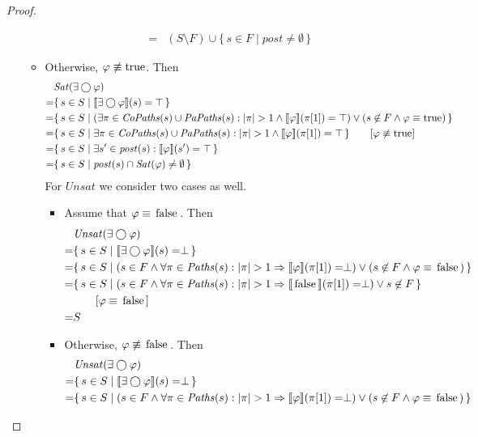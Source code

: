\documentclass[12pt]{article}
\newcommand{\nxt}{\bigcirc}
\newcommand{\TRUE}{\mbox{\lstinline{true}}}
\newcommand{\FALSE}{\mbox{\lstinline{false}}}
\theoremstyle{definition}
\newcommand{\comment}[1]{\hspace{2em}[\mbox{#1}]}
\newcommand{\satisfaction}[1]{\llbracket #1 \rrbracket}
\newenvironment{franck}{\color{red}}{\color{black}}
\begin{document}
\begin{proof}
\begin{itemize}
\begin{franck}
\begin{itemize}
\begin{align*}
= & (S \setminus F) \cup \{\, s \in F \mid \mathit{post} \not= \emptyset \,\}
\end{align*}
\item
Otherwise, $\varphi \not\equiv \TRUE$.  Then
\begin{align*}
& \mathit{Sat}(\exists \nxt \varphi)\\
= & \{\, s \in S \mid \satisfaction{\exists \nxt \varphi}(s) = \top \,\}\\
= & \{\, s \in S \mid (\exists \pi \in \mathit{CoPaths}(s) \cup \mathit{PaPaths}(s) : |\pi| > 1 \wedge \satisfaction{\varphi}(\pi[1]) = \top) \vee (s \not\in F \wedge \varphi \equiv \TRUE) \,\}\\
= & \{\, s \in S \mid \exists \pi \in \mathit{CoPaths}(s) \cup \mathit{PaPaths}(s) : |\pi| > 1 \wedge \satisfaction{\varphi}(\pi[1]) = \top \,\}
\comment{$\varphi \not\equiv \TRUE$}\\
= & \{\, s \in S \mid \exists s' \in \mathit{post}(s) :  \satisfaction{\varphi}(s') = \top \,\}\\
= & \{\, s \in S \mid \mathit{post}(s) \cap \mathit{Sat}(\varphi) \not= \emptyset \,\}
\end{align*}
For $\mathit{Unsat}$ we consider two cases as well.
\begin{itemize}
\item 
Assume that $\varphi \equiv \FALSE$.  Then
\begin{align*}
& \mathit{Unsat}(\exists \nxt \varphi)\\
= & \{\, s \in S \mid \satisfaction{\exists \nxt \varphi}(s) = \perp \,\}\\
= & \{\, s \in S \mid (s \in F \wedge \forall \pi \in \mathit{Paths}(s) : |\pi| > 1 \Rightarrow \satisfaction{\varphi}(\pi[1]) = \perp) \vee (s \not\in F \wedge \varphi \equiv \FALSE) \,\}\\
= & \{\, s \in S \mid (s \in F \wedge \forall \pi \in \mathit{Paths}(s) : |\pi| > 1 \Rightarrow \satisfaction{\FALSE}(\pi[1]) = \perp) \vee s \not\in F \,\}\\
& \comment{$\varphi \equiv \FALSE$}\\
= & S
\end{align*}
\item
Otherwise, $\varphi \not\equiv \FALSE$.  Then
\begin{align*}
& \mathit{Unsat}(\exists \nxt \varphi)\\
= & \{\, s \in S \mid \satisfaction{\exists \nxt \varphi}(s) = \perp \,\}\\
= & \{\, s \in S \mid (s \in F \wedge \forall \pi \in \mathit{Paths}(s) : |\pi| > 1 \Rightarrow \satisfaction{\varphi}(\pi[1]) = \perp) \vee (s \not\in F \wedge \varphi \equiv \FALSE) \,\}\\

\end{align*}
\end{itemize}
\end{itemize}
\end{franck}
\end{itemize}
\end{proof}
\end{document}
